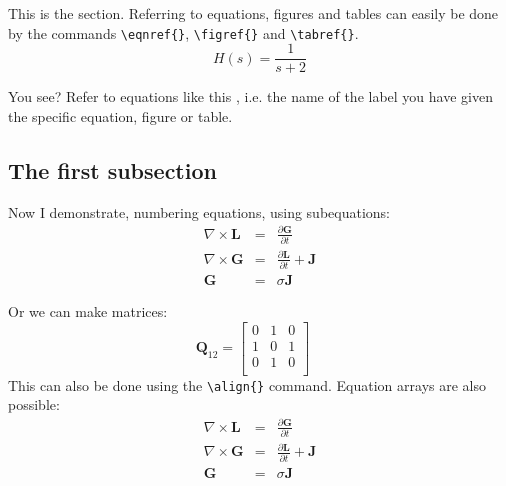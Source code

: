         This is the section. Referring to equations, figures and tables can easily be done by the commands \verb"\eqnref{}",
        \verb"\figref{}" and \verb"\tabref{}".
        \begin{equation}\label{eq:First}
        H(s) = \frac{1}{s+2}
        \end{equation}

        You see? Refer to equations like this , i.e. the name of the label you have given the specific equation, figure or table.
        
        \subsection{The first subsection}
  
        Now I demonstrate, numbering equations, using subequations:
	  \begin{subequations}
		\begin{eqnarray}
    \label{2eq1d1}
	  \nabla\times\mathbf{L}  &=& \frac{\partial\mathbf{G}}{\partial t} \\
    \label{2eq1d2}
  	\nabla\times\mathbf{G}  &=& \frac{\partial\mathbf{L}}{\partial t} + \mathbf{J} \\
    \label{2eq1d3}
    \mathbf{G}              &=& \sigma\mathbf{J}
		\end{eqnarray}
			  \end{subequations}
	
				Or we can make matrices:
				\begin{equation}
				\mathbf{Q}_{12}=\left[\begin{array}{ccc}
		          0  &     1          &  0 \\
	            1  &     0          &  1 \\
	            0  &     1          &  0 \\
       	\end{array}\right]\quad
        \nonumber
		    \label{2eq1cf}
		    \end{equation}
		    This can also be done using the \verb"\align{}" command. Equation arrays are also possible:
     		\begin{eqnarray}
    		\label{2eq1e1}
	  \nabla\times\mathbf{L}  &=& \frac{\partial\mathbf{G}}{\partial t} \\
	    	\label{2eq1e2}
  	\nabla\times\mathbf{G}  &=& \frac{\partial\mathbf{L}}{\partial t} + \mathbf{J} \\
		    \label{2eq1e3}
    \mathbf{G}              &=& \sigma\mathbf{J}
		  \end{eqnarray}

